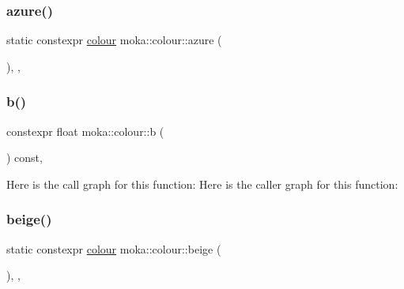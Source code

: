 \mbox{\label{classmoka_1_1colour_a185e9a1f0990b11ca59fd8040b3c3559}} 
\subsubsection{\texorpdfstring{azure()}{azure()}}
{\footnotesize\ttfamily static constexpr \mbox{\hyperlink{classmoka_1_1colour}{colour}} moka\+::colour\+::azure (\begin{DoxyParamCaption}{ }\end{DoxyParamCaption})\hspace{0.3cm}{\ttfamily [inline]}, {\ttfamily [static]}, {\ttfamily [noexcept]}}

\mbox{\label{classmoka_1_1colour_a091a6fe2b9364663da19e7b561739411}} 
\subsubsection{\texorpdfstring{b()}{b()}}
{\footnotesize\ttfamily constexpr float moka\+::colour\+::b (\begin{DoxyParamCaption}{ }\end{DoxyParamCaption}) const\hspace{0.3cm}{\ttfamily [inline]}, {\ttfamily [noexcept]}}

Here is the call graph for this function\+:
Here is the caller graph for this function\+:
\mbox{\label{classmoka_1_1colour_afb2ce945acaca00e4fbfdfaafbf93133}} 
\subsubsection{\texorpdfstring{beige()}{beige()}}
{\footnotesize\ttfamily static constexpr \mbox{\hyperlink{classmoka_1_1colour}{colour}} moka\+::colour\+::beige (\begin{DoxyParamCaption}{ }\end{DoxyParamCaption})\hspace{0.3cm}{\ttfamily [inline]}, {\ttfamily [static]}, {\ttfamily [noexcept]}}

\mbox{\label{classmoka_1_1colour_adfb3cf8ca44c804f0bec28a94917d125}} 
